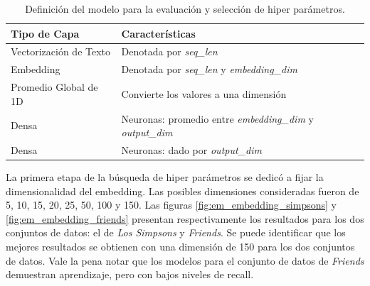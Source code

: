 \begin{table}[h]
    \centering
    \begin{tabular}{|l|l|}
        \hline
        \textbf{Tipo de Capa} & \textbf{Características} \\ \hline
        Vectorización de Texto & Denotada por \textit{seq\_len} \\ \hline
        Embedding & Denotada por \textit{seq\_len} y \textit{embedding\_dim} \\ \hline
        Promedio Global de 1D & Convierte los valores a una dimensión \\ \hline
        Densa & Neuronas: promedio entre \textit{embedding\_dim} y \textit{output\_dim} \\ \hline
        Densa & Neuronas: dado por \textit{output\_dim} \\ \hline
    \end{tabular}
    \caption{Definición del modelo para la evaluación y selección de hiper parámetros.}
    \label{tab:deep_em_hyper_params}
\end{table}

La primera etapa de la búsqueda de hiper parámetros se dedicó a fijar la dimensionalidad del embedding. Las posibles dimensiones consideradas fueron de 5, 10, 15, 20, 25, 50, 100 y 150. Las figuras \ref{fig:em_embedding_simpsons} y \ref{fig:em_embedding_friends} presentan respectivamente los resultados para los dos conjuntos de datos: el de \textit{Los Simpsons} y \textit{Friends}. Se puede identificar que los mejores resultados se obtienen con una dimensión de 150 para los dos conjuntos de datos. Vale la pena notar que los modelos para el conjunto de datos de \textit{Friends} demuestran aprendizaje, pero con bajos niveles de recall.  \\

